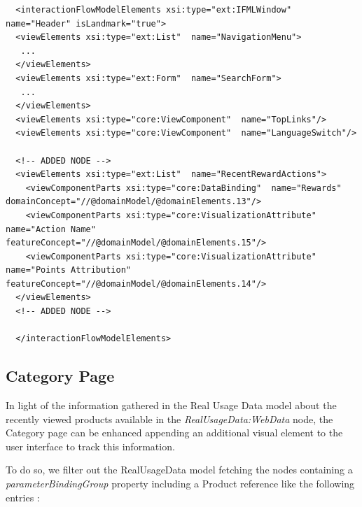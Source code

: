 \vspace{0.5cm}
\lstset{language=XML}
\begin{lstlisting} 
  <interactionFlowModelElements xsi:type="ext:IFMLWindow"  name="Header" isLandmark="true">
  <viewElements xsi:type="ext:List"  name="NavigationMenu">
   ...
  </viewElements>
  <viewElements xsi:type="ext:Form"  name="SearchForm">
   ...
  </viewElements>
  <viewElements xsi:type="core:ViewComponent"  name="TopLinks"/>
  <viewElements xsi:type="core:ViewComponent"  name="LanguageSwitch"/>

  <!-- ADDED NODE -->
  <viewElements xsi:type="ext:List"  name="RecentRewardActions">
    <viewComponentParts xsi:type="core:DataBinding"  name="Rewards" domainConcept="//@domainModel/@domainElements.13"/>
    <viewComponentParts xsi:type="core:VisualizationAttribute"  name="Action Name" featureConcept="//@domainModel/@domainElements.15"/>
    <viewComponentParts xsi:type="core:VisualizationAttribute"  name="Points Attribution" featureConcept="//@domainModel/@domainElements.14"/>
  </viewElements>
  <!-- ADDED NODE -->

  </interactionFlowModelElements>
\end{lstlisting}
\vspace{0.5cm}

\subsection{Category Page}
\label{category-page-updates}
In light of the information gathered in the Real Usage Data model about the recently viewed products available in the \textit{RealUsageData:WebData} node, the Category page can be enhanced appending an additional visual element to the user interface to track this information.

To do so, we filter out the RealUsageData model fetching the nodes containing a \textit{parameterBindingGroup} property including a Product reference like the following entries :

